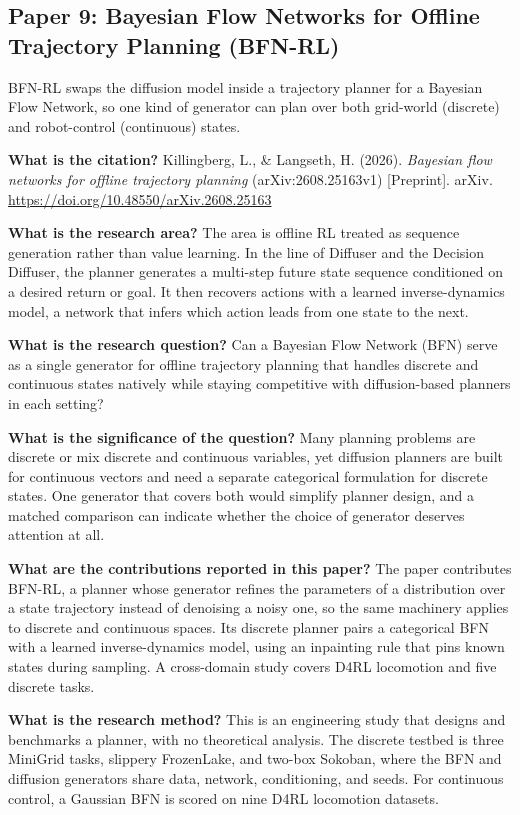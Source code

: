 \documentclass[11pt]{article}
\newcommand{\paper}[1]{\subsection*{#1}}
\newcommand{\q}[2]{\item \textbf{#1} #2}
\begin{document}
\paper{Paper 9: Bayesian Flow Networks for Offline Trajectory Planning (BFN-RL)}
BFN-RL swaps the diffusion model inside a trajectory planner for a Bayesian Flow Network, so one kind of generator can plan over both grid-world (discrete) and robot-control (continuous) states.
\begin{qna}

\q{What is the citation?}
Killingberg, L., \& Langseth, H. (2026). \emph{Bayesian flow networks for offline trajectory planning} (arXiv:2608.25163v1) [Preprint]. arXiv. \url{https://doi.org/10.48550/arXiv.2608.25163}

\q{What is the research area?}
The area is offline RL treated as sequence generation rather than value learning. In the line of Diffuser and the Decision Diffuser, the planner generates a multi-step future state sequence conditioned on a desired return or goal. It then recovers actions with a learned inverse-dynamics model, a network that infers which action leads from one state to the next.

\q{What is the research question?}
Can a Bayesian Flow Network (BFN) serve as a single generator for offline trajectory planning that handles discrete and continuous states natively while staying competitive with diffusion-based planners in each setting?

\q{What is the significance of the question?}
Many planning problems are discrete or mix discrete and continuous variables, yet diffusion planners are built for continuous vectors and need a separate categorical formulation for discrete states. One generator that covers both would simplify planner design, and a matched comparison can indicate whether the choice of generator deserves attention at all.

\q{What are the contributions reported in this paper?}
The paper contributes BFN-RL, a planner whose generator refines the parameters of a distribution over a state trajectory instead of denoising a noisy one, so the same machinery applies to discrete and continuous spaces. Its discrete planner pairs a categorical BFN with a learned inverse-dynamics model, using an inpainting rule that pins known states during sampling. A cross-domain study covers D4RL locomotion and five discrete tasks.

\q{What is the research method?}
This is an engineering study that designs and benchmarks a planner, with no theoretical analysis. The discrete testbed is three MiniGrid tasks, slippery FrozenLake, and two-box Sokoban, where the BFN and diffusion generators share data, network, conditioning, and seeds. For continuous control, a Gaussian BFN is scored on nine D4RL locomotion datasets.


\end{qna}
\end{document}
